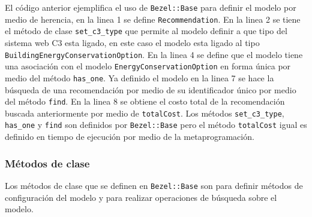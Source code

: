 El código anterior ejemplifica el uso de \texttt{Bezel::Base} para definir el modelo
por medio de herencia, en la linea 1 se define \texttt{Recommendation}. En la linea 2
se tiene el método de clase \texttt{set\_c3\_type} que permite al modelo definir
a que tipo del sistema web C3 esta ligado,  en este caso el modelo esta ligado al
tipo \texttt{BuildingEnergyConservationOption}. En la linea 4 se define que el modelo
tiene una asociación con el modelo \texttt{EnergyConservationOption} en forma única
por medio del método \texttt{has\_one}. Ya definido el modelo en la linea 7 se
hace la búsqueda de una recomendación por medio de su identificador único por medio
del método \texttt{find}. En la linea 8 se obtiene el costo total de la recomendación
buscada anteriormente por medio de \texttt{totalCost}. Los métodos
\texttt{set\_c3\_type}, \texttt{has\_one} y \texttt{find} son definidos por
\texttt{Bezel::Base} pero el método \texttt{totalCost} igual es definido en tiempo
de ejecución por medio de la metaprogramación.

% 

\subsubsection{Métodos de clase}

Los métodos de clase que se definen en \texttt{Bezel::Base} son para
definir métodos de configuración del modelo y para realizar operaciones
de búsqueda sobre el modelo.




